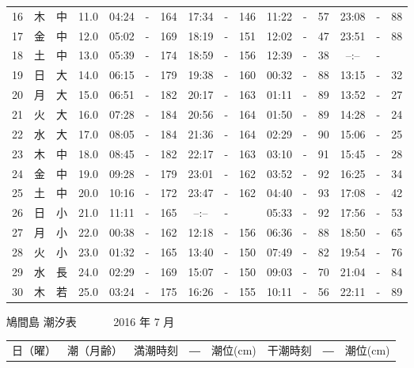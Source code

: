 \documentclass[12pt.a4j]{jsarticle}
\begin{document}
\begin{center}
\begin{table}[ht]
\begin{tabular}{|rc|cr|ccrccr|ccrccr|}
16 & 木 & 中 & 11.0 &  04:24 &-& 164  &  17:34 &-& 146  &   11:22 &-&  57  &   23:08 &-&  88  \\
17 & 金 & 中 & 12.0 &  05:02 &-& 169  &  18:19 &-& 151  &   12:02 &-&  47  &   23:51 &-&  88  \\
18 & 土 & 中 & 13.0 &  05:39 &-& 174  &  18:59 &-& 156  &   12:39 &-&  38  &   --:-- &-&     \\
19 & 日 & 大 & 14.0 &  06:15 &-& 179  &  19:38 &-& 160  &   00:32 &-&  88  &   13:15 &-&  32  \\
20 & 月 & 大 & 15.0 &  06:51 &-& 182  &  20:17 &-& 163  &   01:11 &-&  89  &   13:52 &-&  27  \\
21 & 火 & 大 & 16.0 &  07:28 &-& 184  &  20:56 &-& 164  &   01:50 &-&  89  &   14:28 &-&  24  \\
22 & 水 & 大 & 17.0 &  08:05 &-& 184  &  21:36 &-& 164  &   02:29 &-&  90  &   15:06 &-&  25  \\
23 & 木 & 中 & 18.0 &  08:45 &-& 182  &  22:17 &-& 163  &   03:10 &-&  91  &   15:45 &-&  28  \\
24 & 金 & 中 & 19.0 &  09:28 &-& 179  &  23:01 &-& 162  &   03:52 &-&  92  &   16:25 &-&  34  \\
25 & 土 & 中 & 20.0 &  10:16 &-& 172  &  23:47 &-& 162  &   04:40 &-&  93  &   17:08 &-&  42  \\
26 & 日 & 小 & 21.0 &  11:11 &-& 165  &  --:-- &-&     &   05:33 &-&  92  &   17:56 &-&  53  \\
27 & 月 & 小 & 22.0 &  00:38 &-& 162  &  12:18 &-& 156  &   06:36 &-&  88  &   18:50 &-&  65  \\
28 & 火 & 小 & 23.0 &  01:32 &-& 165  &  13:40 &-& 150  &   07:49 &-&  82  &   19:54 &-&  76  \\
29 & 水 & 長 & 24.0 &  02:29 &-& 169  &  15:07 &-& 150  &   09:03 &-&  70  &   21:04 &-&  84  \\
30 & 木 & 若 & 25.0 &  03:24 &-& 175  &  16:26 &-& 155  &   10:11 &-&  56  &   22:11 &-&  89  \\
   \hline
   \end{tabular}
\end{table}
\newpage
 {\LARGE 鳩間島  潮汐表　　　}
 {\large 2016 年  7 月}\\
 \begin{table}[ht]
    \begin{tabular}{|rc|cr|ccrccr|ccrccr|}
    \hline
    \multicolumn{2}{|c|}{日（曜）} & \multicolumn{2}{c|}{潮（月齢）} & \multicolumn{6}{c|}{満潮時刻　―　潮位(cm)} & \multicolumn{6}{c|}{干潮時刻　―　潮位(cm)} \\

\end{tabular}
\end{table}
\end{center}
\end{document}

